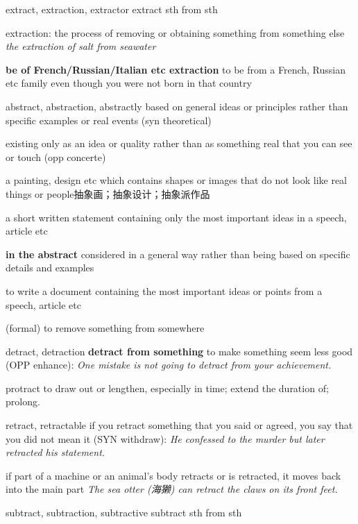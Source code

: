\begin{word}{extract, extraction, extractor}
    \label{extract}
    extract sth from sth

    extraction: the process of removing or obtaining something from something else
    \textit{the extraction of salt from seawater}

    \textbf{be of French/Russian/Italian etc extraction} to be from a French, Russian etc family even though you were not born in that country
\end{word}

\begin{word}{abstract, abstraction, abstractly}
    based on general ideas or principles rather than specific examples or real events (syn theoretical)

    existing only as an idea or quality rather than as something real that you can see or touch (opp concerte)

    a painting, design etc which contains shapes or images that do not look like real things or people抽象画；抽象设计；抽象派作品

    a short written statement containing only the most important ideas in a speech, article etc
    
    \textbf{in the abstract} considered in a general way rather than being based on specific details and examples

    to write a document containing the most important ideas or points from a speech, article etc

    (formal) to remove something from somewhere
\end{word}

\begin{word}{detract, detraction}
    \label{detract}
    \textbf{detract from something}
    to make something seem less good (OPP  enhance):
    \textit{One mistake is not going to detract from your achievement.}
\end{word}

\begin{word}{protract}
    \label{protract}
    to draw out or lengthen, especially in time; extend the duration of; prolong.
\end{word}

\begin{word}{retract, retractable}
    if you retract something that you said or agreed, you say that you did not mean it (SYN  withdraw):
    \textit{He confessed to the murder but later retracted his statement.}

    if part of a machine or an animal’s body retracts or is retracted, it moves back into the main part
    \textit{The sea otter (海獭) can retract the claws on its front feet.}
\end{word}

\begin{word}{subtract, subtraction, subtractive}
    subtract sth from sth
\end{word}